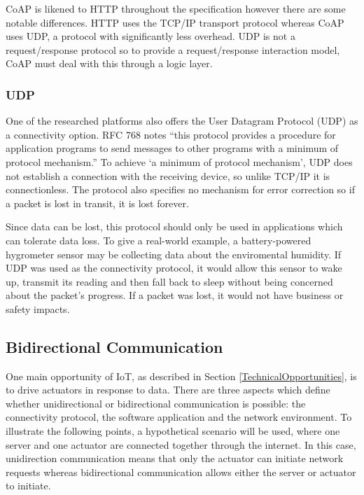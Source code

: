         CoAP is likened to HTTP throughout the specification however there are some notable differences. HTTP uses the TCP/IP transport protocol whereas CoAP uses UDP, a protocol with significantly less overhead. UDP is not a request/response protocol so to provide a request/response interaction model, CoAP must deal with this through a logic layer.

      \subsubsection{UDP}
        One of the researched platforms also offers the User Datagram Protocol (UDP) as a connectivity option. RFC 768 \citep{rfc768} notes ``this protocol provides a procedure for application programs to send messages to other programs with a minimum of protocol mechanism.'' To achieve `a minimum of protocol mechanism', UDP does not establish a connection with the receiving device, so unlike TCP/IP it is connectionless. The protocol also specifies no mechanism for error correction so if a packet is lost in transit, it is lost forever.

        Since data can be lost, this protocol should only be used in applications which can tolerate data loss. To give a real-world example, a battery-powered hygrometer sensor may be collecting data about the enviromental humidity. If UDP was used as the connectivity protocol, it would allow this sensor to wake up, transmit its reading and then fall back to sleep without being concerned about the packet's progress. If a packet was lost, it would not have business or safety impacts.

    \subsection{Bidirectional Communication} \label{bidirectioncomms}
      One main opportunity of IoT, as described in Section \ref{TechnicalOpportunities}, is to drive actuators in response to data. There are three aspects which define whether unidirectional or bidirectional communication is possible: the connectivity protocol, the software application and the network environment. To illustrate the following points, a hypothetical scenario will be used, where one server and one actuator are connected together through the internet. In this case, unidirection communication means that only the actuator can initiate network requests whereas bidirectional communication allows either the server or actuator to initiate.

